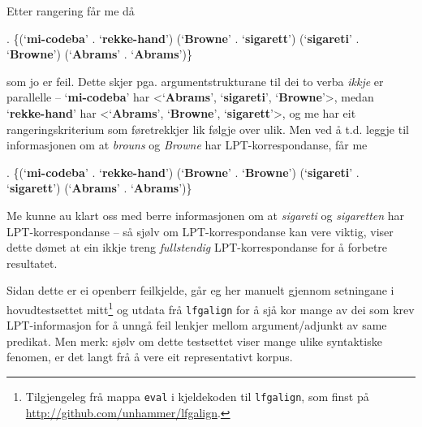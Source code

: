 \documentclass[11pt,a4paper,oneside,draft]{book}
\newcommand{\p}[1]{`\textbf{#1}'}
\begin{document}
 Etter rangering får me då 

\ex. \{(\p{mi-codeba} . \p{rekke-hand}) (\p{Browne} . \p{sigarett}) (\p{sigareti} . \p{Browne}) (\p{Abrams} . \p{Abrams})\} 

 som jo er feil. Dette skjer pga. argumentstrukturane til dei to verba
 \emph{ikkje} er parallelle -- \p{mi-codeba} har <\p{Abrams}, \p{sigareti},
 \p{Browne}>, medan \p{rekke-hand} har <\p{Abrams}, \p{Browne},
 \p{sigarett}>, og me har eit rangeringskriterium som føretrekkjer lik
 følgje over ulik. Men ved å t.d. leggje til informasjonen om at \emph{brouns}
 og \emph{Browne} har LPT-korrespondanse, får me

\ex. \{(\p{mi-codeba} . \p{rekke-hand})
 (\p{Browne} . \p{Browne}) (\p{sigareti} . \p{sigarett}) (\p{Abrams} . \p{Abrams})\}

 Me kunne au klart oss med berre informasjonen om at \emph{sigareti} og
 \emph{sigaretten} har LPT-korrespondanse -- så sjølv om LPT-korrespondanse
 kan vere viktig, viser dette dømet at ein ikkje treng \emph{fullstendig}
 LPT-korrespondanse for å forbetre resultatet.

 Sidan dette er ei openberr feilkjelde, går eg her manuelt gjennom
 setningane i hovudtestsettet mitt\footnote{Tilgjengeleg frå mappa \texttt{eval} i kjeldekoden til \texttt{lfgalign},
        som finst på \href{http://github.com/unhammer/lfgalign}{http://github.com/unhammer/lfgalign}. } og utdata frå \texttt{lfgalign} for
 å sjå kor mange av dei som krev LPT-informasjon for å unngå feil
 lenkjer mellom argument/adjunkt av same predikat. Men merk: sjølv om
 dette testsettet viser mange ulike syntaktiske fenomen, er det langt
 frå å vere eit representativt korpus.
\end{document}
